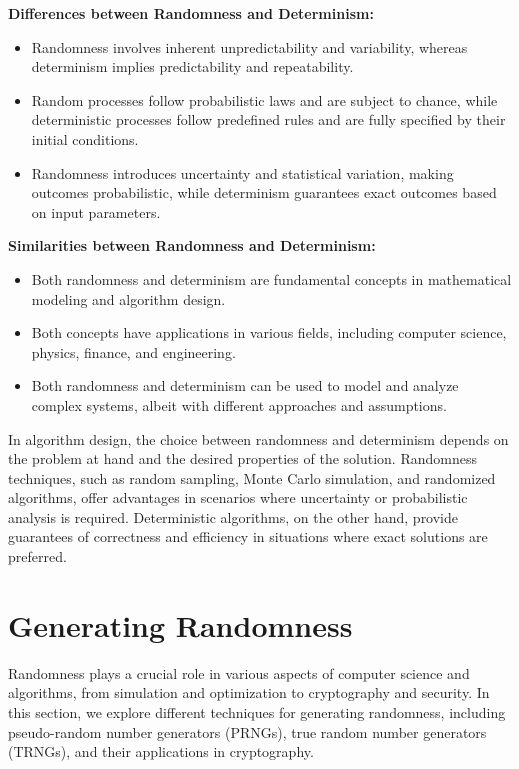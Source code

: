 \documentclass[12pt]{book} %
\begin{document}
\textbf{Differences between Randomness and Determinism:}
\begin{itemize}
    \item Randomness involves inherent unpredictability and variability, whereas determinism implies predictability and repeatability.
    \item Random processes follow probabilistic laws and are subject to chance, while deterministic processes follow predefined rules and are fully specified by their initial conditions.
    \item Randomness introduces uncertainty and statistical variation, making outcomes probabilistic, while determinism guarantees exact outcomes based on input parameters.
\end{itemize}

\textbf{Similarities between Randomness and Determinism:}
\begin{itemize}
    \item Both randomness and determinism are fundamental concepts in mathematical modeling and algorithm design.
    \item Both concepts have applications in various fields, including computer science, physics, finance, and engineering.
    \item Both randomness and determinism can be used to model and analyze complex systems, albeit with different approaches and assumptions.
\end{itemize}

In algorithm design, the choice between randomness and determinism depends on the problem at hand and the desired properties of the solution. Randomness techniques, such as random sampling, Monte Carlo simulation, and randomized algorithms, offer advantages in scenarios where uncertainty or probabilistic analysis is required. Deterministic algorithms, on the other hand, provide guarantees of correctness and efficiency in situations where exact solutions are preferred.


\section{Generating Randomness}

Randomness plays a crucial role in various aspects of computer science and algorithms, from simulation and optimization to cryptography and security. In this section, we explore different techniques for generating randomness, including pseudo-random number generators (PRNGs), true random number generators (TRNGs), and their applications in cryptography.
\end{document}
